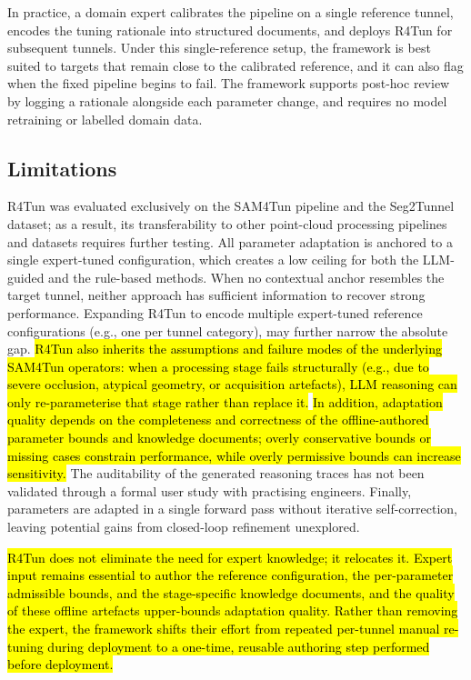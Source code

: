 \documentclass[a4paper,fleqn]{cas-dc}
\begin{document}
{In practice, a domain expert calibrates the pipeline on a single reference tunnel, encodes the tuning rationale into structured documents, and deploys R4Tun for subsequent tunnels. Under this single-reference setup, the framework is best suited to targets that remain close to the calibrated reference, and it can also flag when the fixed pipeline begins to fail. The framework supports post-hoc review by logging a rationale alongside each parameter change, and requires no model retraining or labelled domain data.


\subsection{Limitations}\label{sec:limitations}

R4Tun was evaluated exclusively on the SAM4Tun pipeline and the Seg2Tunnel dataset; as a result, its transferability to other point-cloud processing pipelines and datasets requires further testing. All parameter adaptation is anchored to a single expert-tuned configuration, which creates a low ceiling for both the LLM-guided and the rule-based methods. When no contextual anchor resembles the target tunnel, neither approach has sufficient information to recover strong performance. Expanding R4Tun to encode multiple expert-tuned reference configurations (e.g., one per tunnel category), may further narrow the absolute gap. \hl{R4Tun also inherits the assumptions and failure modes of the underlying SAM4Tun operators: when a processing stage fails structurally (e.g., due to severe occlusion, atypical geometry, or acquisition artefacts), LLM reasoning can only re-parameterise that stage rather than replace it.} \hl{In addition, adaptation quality depends on the completeness and correctness of the offline-authored parameter bounds and knowledge documents; overly conservative bounds or missing cases constrain performance, while overly permissive bounds can increase sensitivity.} The auditability of the generated reasoning traces has not been validated through a formal user study with practising engineers. Finally, parameters are adapted in a single forward pass without iterative self-correction, leaving potential gains from closed-loop refinement unexplored.

\hl{R4Tun does not eliminate the need for expert knowledge; it relocates it. Expert input remains essential to author the reference configuration, the per-parameter admissible bounds, and the stage-specific knowledge documents, and the quality of these offline artefacts upper-bounds adaptation quality. Rather than removing the expert, the framework shifts their effort from repeated per-tunnel manual re-tuning during deployment to a one-time, reusable authoring step performed before deployment.}

}
\end{document}
